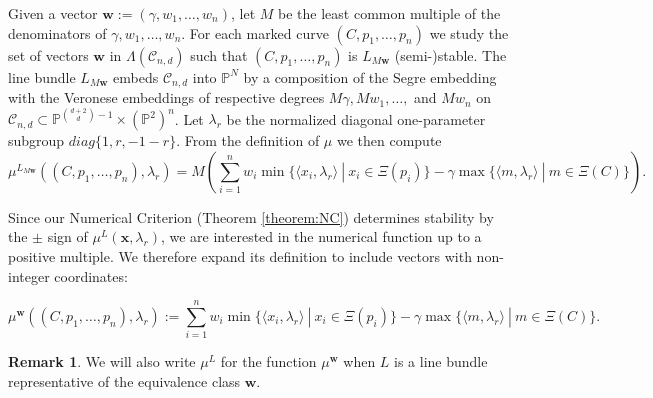 \documentclass{amsart}
\newcommand{\Pj}{\mathbb{P}}
\newcommand{\mc}{\mathcal}
\numberwithin{equation}{section}
\theoremstyle{definition}
\newtheorem{rmk}[prop]{Remark}
\begin{document}
Given a vector $\mathbf{w}:=(\gamma, w_1, \dots , w_n)$, let  $M$ be the least common multiple of the denominators of $\gamma, w_1, \dots , w_n$. For each marked curve $(C, p_1, \dots , p_n)$ we study the set of vectors $\mathbf{w}$ in $\Lambda(\mc{C}_{n,d})$ such that $(C, p_1, \dots , p_n)$ is $L_{M\mathbf{w}}$ (semi-)stable.  The line bundle $L_{M\mathbf{w}}$ embeds $\mc{C}_{n,d}$ into $\Pj^N$ by a composition of the Segre embedding with the Veronese embeddings of  respective degrees $M \gamma, M w_1, \dots ,$ and $ M w_n$ on $\mc{C}_{n,d} \subset \Pj^{\binom{d+2}{d}-1} \times (\Pj^2)^n $. Let  $\lambda_r$ be the normalized diagonal one-parameter subgroup $diag\{1,r,-1-r\}$. From the definition of $\mu$ we then compute
\begin{equation} 
    \mu^{L_{M\mathbf{w}}}((C,p_1, \ldots, p_n), \lambda_r)
=
M(\sum_{i=1}^n w_i \min \{ \langle x_i , \lambda_r \rangle \ | \ x_i \in \Xi(p_i) \} - \gamma \max \{ \langle m, \lambda_r \rangle \ | \ m \in \Xi(C) \}). 
\end{equation}

Since our Numerical Criterion (Theorem \ref{theorem:NC}) determines stability by the $\pm$ sign of $\mu^L(\mathbf{x}, \lambda_r)$, we are interested in the numerical function up to a positive multiple. We therefore expand its definition to include vectors with non-integer coordinates:

\begin{equation} \label{eq:mu}
    \mu^{\mathbf{w}}((C,p_1, \ldots, p_n), \lambda_r)
:=
\sum_{i=1}^n w_i \min \{ \langle x_i , \lambda_r \rangle \ | \ x_i \in \Xi(p_i) \} - \gamma \max \{ \langle m, \lambda_r \rangle \ | \ m \in \Xi(C) \}. 
\end{equation}

\begin{rmk}
    We will also write $\mu^L$ for the function $\mu^{\mathbf{w}}$ when $L$ is a line bundle representative of the equivalence class $\mathbf{w}$.
\end{rmk}
\end{document}
